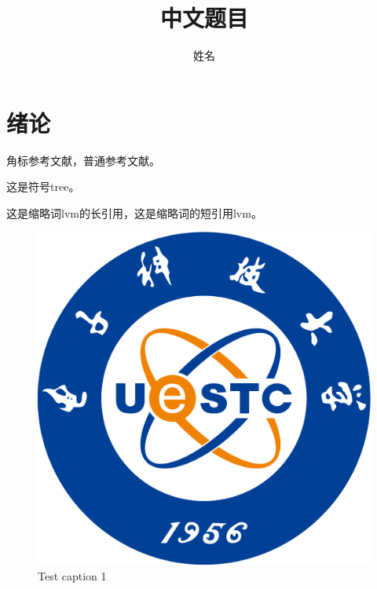 \documentclass[promaster]{thesis-uestc}
\title{中文题目}{English Title} %
\author{姓名}{English Name} %
\begin{document}
\makecover %
\originalitydeclaration %
\begin{chineseabstract}

\end{chineseabstract}
\begin{englishabstract}

\end{englishabstract}

\thesistableofcontents %
\thesisfigurelist %
\thesistablelist %
\thesisglossarylist %
\thesissymbollist %

\chapter{绪\hspace{6pt}论}

角标参考文献，普通参考文献\cite{clerc2010discrete}。

这是符号\gls{tree}。

这是缩略词\acrlong{lvm}的长引用，这是缩略词的短引用\acrshort{lvm}。

\begin{figure}
    \includegraphics[width=0.5\linewidth]{pic/logo.pdf}
    \caption[short catption 1]{Test caption 1}
\end{figure}
\end{document}

